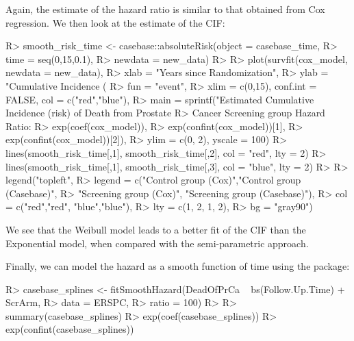 \documentclass[
]{jss}
\begin{document}
Again, the estimate of the hazard ratio is similar to that obtained from
Cox regression. We then look at the estimate of the CIF:

\begin{CodeChunk}

\begin{CodeInput}
R> smooth_risk_time <- casebase::absoluteRisk(object = casebase_time, 
R>                                           time = seq(0,15,0.1), 
R>                                           newdata = new_data)
R> 
R> plot(survfit(cox_model, newdata = new_data),
R>      xlab = "Years since Randomization", 
R>      ylab = "Cumulative Incidence (%
R>      fun = "event",
R>      xlim = c(0,15), conf.int = FALSE, col = c("red","blue"), 
R>      main = sprintf("Estimated Cumulative Incidence (risk) of Death from Prostate 
R>                     Cancer Screening group Hazard Ratio: %
R>                     exp(coef(cox_model)), 
R>                     exp(confint(cox_model))[1], 
R>                     exp(confint(cox_model))[2]),
R>      ylim = c(0, 2), yscale = 100)
R> lines(smooth_risk_time[,1], smooth_risk_time[,2], col = "red", lty = 2)
R> lines(smooth_risk_time[,1], smooth_risk_time[,3], col = "blue", lty = 2)
R> 
R> legend("topleft", 
R>        legend = c("Control group (Cox)","Control group (Casebase)",
R>                   "Screening group (Cox)", "Screening group (Casebase)"), 
R>        col = c("red","red", "blue","blue"),
R>        lty = c(1, 2, 1, 2), 
R>        bg = "gray90")
\end{CodeInput}
\end{CodeChunk}

We see that the Weibull model leads to a better fit of the CIF than the
Exponential model, when compared with the semi-parametric approach.

Finally, we can model the hazard as a smooth function of time using the
 package:

\begin{CodeChunk}

\begin{CodeInput}
R> casebase_splines <- fitSmoothHazard(DeadOfPrCa ~ bs(Follow.Up.Time) + ScrArm, 
R>                                     data = ERSPC, 
R>                                     ratio = 100)
R> 
R> summary(casebase_splines)
R> exp(coef(casebase_splines))
R> exp(confint(casebase_splines))
\end{CodeInput}
\end{CodeChunk}
\end{document}
